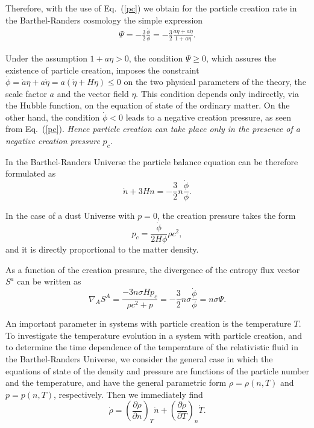\documentclass[aps,superscriptaddress, showpacs,preprintnumbers, superscriptaddress, nofootinbibt,twocolumn]{revtex4-2}
\def\be{\begin{equation}}
\def\ee{\end{equation}}
\begin{document}
Therefore, with the use of Eq.~(\ref{pc}) we obtain for the particle  creation rate in the Barthel-Randers cosmology the simple expression
\begin{eqnarray}
\Psi=-\frac{3}{2}\frac{\dot{\phi}}{\phi}=-\frac{3}{2}\frac{\dot{a}\eta+a\dot{\eta}}{1+a\eta}.
\end{eqnarray}

Under the assumption $1+a\eta >0$, the condition $\Psi \geq 0$, which assures the existence of particle creation, imposes the  constraint $\dot{\phi}=\dot{a}\eta+a\dot{\eta}=a\left(\dot{\eta}+H\eta\right)\leq 0$ on the two
physical parameters of the theory, the scale factor $a$ and the vector field $\eta$. This condition depends only indirectly, via the Hubble function, on the equation of state of the ordinary matter. On the other hand, the condition $\dot{\phi}<0$ leads to a negative creation pressure, as seen from Eq.~(\ref{pc}). {\it Hence particle creation can take place only in the presence of a negative creation pressure} $p_c$.

In the Barthel-Randers Universe the particle balance equation can be therefore formulated as
\be
\dot{n}+3Hn=-\frac{3}{2}n\frac{\dot{\phi}}{\phi}.
\ee

In the case of a dust Universe with $p=0$, the creation pressure takes the form
\be
p_{c}=\frac{\dot{\phi}}{2H\phi}\rho c^2,
\ee
and it is directly proportional to the matter density.

As a function of  the creation pressure, the divergence of the entropy flux vector $S^a$ can be written  as
\begin{equation}
\nabla _{A}S^{A}=\frac{-3 n \sigma H p_c}{\rho c^2 +p}=-\frac{3}{2}n\sigma \frac{\dot{\phi}}{\phi}=n\sigma \Psi.
\end{equation}

An important parameter in systems with particle creation is the temperature $T$. To investigate the temperature evolution in a system with particle
creation, and to determine the time dependence of the temperature of the relativistic
fluid in the Barthel-Randers Universe, we consider the general case in which the equations of state of the density and pressure are functions of the particle number and the temperature, and
have the general parametric form $\rho =\rho (n, T )$ and $p=p(n,T)$, respectively. Then
we immediately find
\begin{equation}
\dot{\rho}=\left(\frac{\partial \rho }{\partial n} \right)_T\dot{n}+\left(%
\frac{\partial \rho }{\partial T} \right)_n\dot{T}.
\end{equation}
\end{document}
